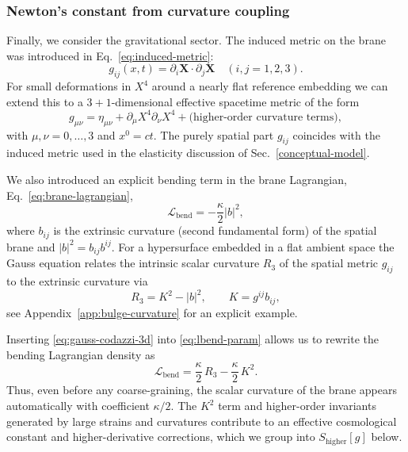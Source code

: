 \subsubsection{Newton's constant from curvature coupling}
\label{sec:newton-from-curvature}

Finally, we consider the gravitational sector.
The induced metric on the brane was introduced in Eq.~\eqref{eq:induced-metric}:
%
\begin{equation}
  g_{ij}(x,t)=\partial_i\mathbf{X}\cdot\partial_j\mathbf{X}\quad (i,j=1,2,3).
\end{equation}
%
For small deformations in $X^4$ around a nearly flat reference embedding we can
extend this to a $3+1$-dimensional effective spacetime metric of the form
%
\begin{equation}
  g_{\mu\nu} = \eta_{\mu\nu}
  + \partial_\mu X^4 \partial_\nu X^4
  + \text{(higher-order curvature terms)},
\end{equation}
%
with $\mu,\nu=0,\dots,3$ and $x^0 = ct$.
The purely spatial part $g_{ij}$ coincides with the induced metric used in
the elasticity discussion of Sec.~\ref{conceptual-model}.

We also introduced an explicit bending term in the brane Lagrangian,
Eq.~\eqref{eq:brane-lagrangian},
%
\begin{equation}
  \mathcal{L}_{\mathrm{bend}} = -\frac{\kappa}{2} |b|^2,
  \label{eq:lbend-param}
\end{equation}
%
where $b_{ij}$ is the extrinsic curvature (second fundamental form)
of the spatial brane and $|b|^2 = b_{ij}b^{ij}$.
For a hypersurface embedded in a flat ambient space the Gauss equation
relates the intrinsic scalar curvature $R_3$ of the spatial metric
$g_{ij}$ to the extrinsic curvature via
%
\begin{equation}
  R_3 = K^2 - |b|^2,
  \qquad
  K = g^{ij} b_{ij},
  \label{eq:gauss-codazzi-3d}
\end{equation}
%
see Appendix~\ref{app:bulge-curvature} for an explicit example.

Inserting \eqref{eq:gauss-codazzi-3d} into \eqref{eq:lbend-param}
allows us to rewrite the bending Lagrangian density as
%
\begin{equation}
  \mathcal{L}_{\mathrm{bend}}
  = \frac{\kappa}{2}\,R_3 - \frac{\kappa}{2}\,K^2.
  \label{eq:lbend-RK2}
\end{equation}
%
Thus, even before any coarse-graining, the scalar curvature of the brane
appears automatically with coefficient $\kappa/2$.
The $K^2$ term and higher-order invariants generated by large strains and
curvatures contribute to an effective cosmological constant and higher-derivative
corrections, which we group into $S_\text{higher}[g]$ below.

